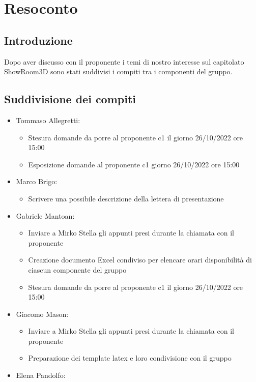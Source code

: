 \section{Resoconto}
\subsection{Introduzione}
Dopo aver discusso con il proponente i temi di nostro interesse sul capitolato ShowRoom3D 
sono stati suddivisi i compiti tra i componenti del gruppo.
\subsection{Suddivisione dei compiti}
\begin{itemize}
    \item Tommaso Allegretti:
    \begin{itemize}
        \item Stesura domande da porre al proponente c1 il giorno 26/10/2022 ore 15:00
        \item Esposizione domande al proponente c1 giorno 26/10/2022 ore 15:00
    \end{itemize}
    \item Marco Brigo:
    \begin{itemize}
        \item Scrivere una possibile descrizione della lettera di presentazione
    \end{itemize}
    \item Gabriele Mantoan:
    \begin{itemize}
        \item Inviare a Mirko Stella gli appunti presi durante la chiamata con il proponente
        \item Creazione documento Excel condiviso per elencare orari disponibilità di ciascun componente del gruppo
        \item Stesura domande da porre al proponente c1 il giorno 26/10/2022 ore 15:00
    \end{itemize}
    \item Giacomo Mason:
    \begin{itemize}
        \item Inviare a Mirko Stella gli appunti presi durante la chiamata con il proponente
        \item Preparazione dei template latex e loro condivisione con il gruppo
    \end{itemize}
    \item Elena Pandolfo:

\end{itemize}
